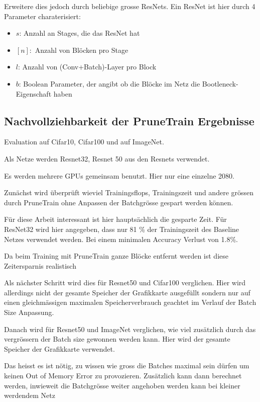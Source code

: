 Erweitere dies jedoch durch beliebige grosse ResNets. Ein ResNet ist hier durch 4 Parameter charaterisiert:

\begin{itemize}
 \item $s$: Anzahl an Stages, die das ResNet hat
 \item $[n]:$ Anzahl von Blöcken pro Stage 
 \item $l$: Anzahl von (Conv+Batch)-Layer pro Block
 \item $b$: Boolean Parameter, der angibt ob die Blöcke im Netz die Bootleneck-Eigenschaft haben
\end{itemize}

\subsection{Nachvollziehbarkeit der PruneTrain Ergebnisse}
\color{blue1}
Evaluation auf Cifar10, Cifar100 und auf ImageNet.


Als Netze werden Resnet32, Resnet 50 aus den Resnets verwendet.


Es werden mehrere GPUs gemeinsam benutzt. Hier nur eine einzelne 2080.


Zunächst wird überprüft wieviel Trainingsflops, Trainingszeit und andere grössen durch PruneTrain ohne Anpassen der Batchgrösse gespart werden können.


Für diese Arbeit interessant ist hier hauptsächlich die gesparte Zeit. Für ResNet32 wird hier angegeben, dass nur 81 \% der Trainingszeit des Baseline Netzes verwendet werden. Bei einem minimalen Accuracy Verlust von 1.8\%. 


Da beim Training mit PruneTrain ganze Blöcke entfernt werden ist diese Zeitersparnis realistisch


Als nächster Schritt wird dies für Resnet50 und Cifar100 verglichen. Hier wird allerdings nicht der gesamte Speicher der Grafikkarte ausgefüllt sondern nur auf einen gleichmässigen maximalen Speicherverbrauch geachtet im Verlauf der Batch Size Anpassung.







Danach wird für Resnet50 und ImageNet verglichen, wie viel zusätzlich durch das vergrössern der Batch size gewonnen werden kann.
Hier wird der gesamte Speicher der Grafikkarte verwendet.

Das heisst es ist nötig, zu wissen wie gross die Batches maximal sein dürfen um keinen Out of Memory Error zu provozieren. Zusätzlich kann dann berechnet werden, inwieweit die Batchgrösse weiter angehoben werden kann bei kleiner werdendem Netz

